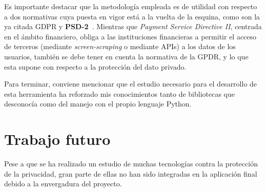 Es importante destacar que la metodología empleada es de utilidad con 
respecto a dos normativas cuya puesta en vigor está a la vuelta de la 
esquina, como son la ya citada GDPR y \textbf{PSD-2}~\cite{article:psd2}.
Mientras que \textit{Payment Service Directive II}, centrada en el ámbito 
financiero, obliga a las instituciones financieras a permitir el acceso de 
terceros (mediante \textit{screen-scraping} o mediante APIs) a los datos de los usuarios, también se debe tener en cuenta la normativa de la GPDR, y lo que esta 
supone con respecto a la protección del dato privado.

Para terminar, conviene mencionar que el estudio necesario para el
desarrollo de esta herramienta ha reforzado mis conocimientos tanto de
bibliotecas que desconocía como del manejo con el propio lenguaje
Python.

\section{Trabajo futuro}

Pese a que se ha realizado un estudio de muchas tecnologías contra la protección de la privacidad, gran parte de ellas no han sido integradas en la aplicación final debido a la envergadura del proyecto.

